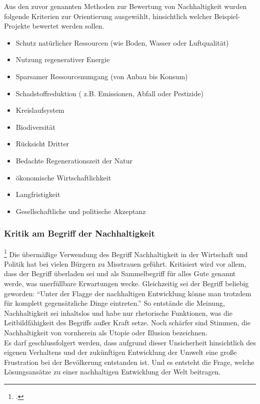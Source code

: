 \documentclass{scrartcl}
\begin{document}
Aus den zuvor genannten Methoden zur Bewertung von Nachhaltigkeit wurden folgende Kriterien zur Orientierung ausgewählt, hinsichtlich welcher Beispiel-Projekte bewertet werden sollen.

\begin{itemize}
\item  Schutz natürlicher Ressourcen (wie Boden, Wasser oder Luftqualität)
\item Nutzung regenerativer Energie
\item Sparsamer Ressourcenumgang (von Anbau bis Konsum)
\item Schadstoffreduktion ( z.B. Emissionen, Abfall oder Pestizide)
\item Kreislaufsystem
\item Biodiversität
\item Rücksicht Dritter
\item Bedachte Regenerationszeit der Natur
\item ökonomische Wirtschaftlichkeit
\item Langfristigkeit
\item Gesellschaftliche und politische Akzeptanz
\end{itemize}


\subsubsection{Kritik am Begriff der Nachhaltigkeit}\footcite{NachhaltigeBrockhaus.de}
Die übermäßige Verwendung des Begriff Nachhaltigkeit in der Wirtschaft und Politik hat bei vielen Bürgern zu Misstrauen geführt. Kritisiert wird vor allem, dass der Begriff überladen sei und als Sammelbegriff für alles Gute genannt werde, was unerfüllbare Erwartungen wecke. Gleichzeitig sei der Begriff beliebig geworden: “Unter der Flagge der nachhaltigen Entwicklung könne man trotzdem für komplett gegensätzliche Dinge eintreten.” So entstände die Meinung, Nachhaltigkeit sei inhaltslos und habe nur rhetorische Funktionen, was die Leitbildfähigkeit des Begriffs außer Kraft setze. Noch schärfer sind Stimmen, die Nachhaltigkeit von vornherein als Utopie oder Illusion bezeichnen.
\\
Es darf geschlussfolgert werden, dass aufgrund dieser Unsicherheit hinsichtlich des eigenen Verhaltens und der zukünftigen Entwicklung der Umwelt eine große Frustration bei der Bevölkerung entstanden ist. Und es entsteht die Frage, welche Lösungsansätze zu einer nachhaltigen Entwicklung der Welt beitragen.  
\end{document}
